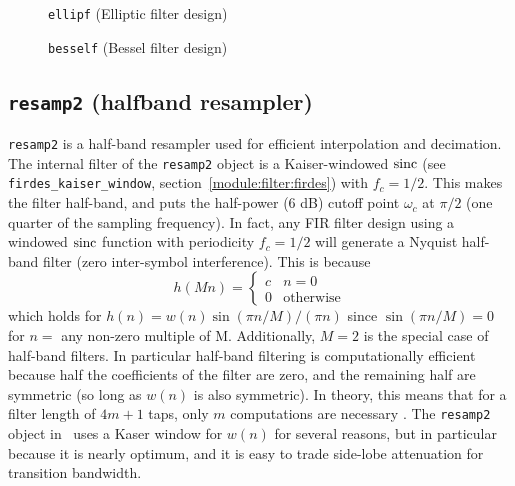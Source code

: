 \begin{figure}
\centering
{}
\caption{{\tt ellipf} (Elliptic filter design)}
\label{fig:module:filter:ellip}
\end{figure}

\begin{figure}
\centering
{}
\caption{{\tt besself} (Bessel filter design)}
\label{fig:module:filter:bessel}
\end{figure}


\subsection{{\tt resamp2} (halfband resampler)}
\label{module:filter:resamp2}
{\tt resamp2} is a half-band resampler used for efficient interpolation and
decimation.
The internal filter of the {\tt resamp2} object is a Kaiser-windowed $\textup{sinc}$
(see {\tt firdes\_kaiser\_window}, section~\ref{module:filter:firdes}) with
$f_c = 1/2$.
This makes the filter half-band, and puts the half-power (6 dB) cutoff point
$\omega_c$ at $\pi/2$ (one quarter of the sampling frequency).
In fact, any FIR filter design using a windowed $\textup{sinc}$ function with
periodicity $f_c=1/2$ will generate a Nyquist half-band filter (zero
inter-symbol interference).
This is because \cite[(4.6.3)]{Vaidyanathan:1993}
\[
    h(Mn) = 
        \begin{cases}
        c & n=0 \\
        0 & \text{otherwise}
        \end{cases}
\]
which holds for $h(n) = w(n) \sin(\pi n/M) / (\pi n)$ since
$\sin(\pi n/M) = 0$ for $n=$ any non-zero multiple of M.
Additionally, $M=2$ is the special case of half-band filters.
In particular half-band filtering is computationally efficient because half
the coefficients of the filter are zero, and the remaining half are symmetric
(so long as $w(n)$ is also symmetric).
In theory, this means that for a filter length of $4m+1$ taps, only $m$
computations are necessary \cite{harris:2004}.
The {\tt resamp2} object in \liquid\ uses a Kaser window for $w(n)$ for
several reasons, but in particular because it is nearly optimum, and it is
easy to trade side-lobe attenuation for transition bandwidth.

